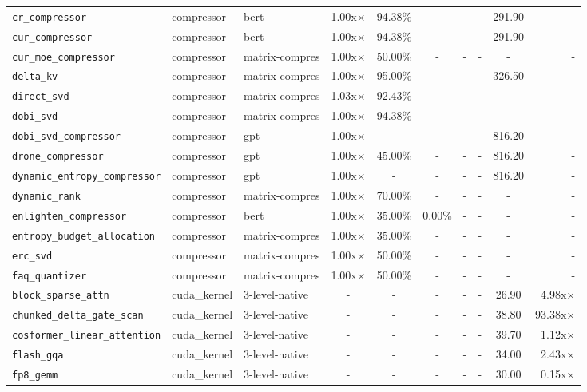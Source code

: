 \begin{center}
\begin{longtable}{lllccccccr}
\texttt{cr\_compressor} & compressor & bert & 1.00x$\times$ & 94.38\% & - & - & - & 291.90 & - \\
\texttt{cur\_compressor} & compressor & bert & 1.00x$\times$ & 94.38\% & - & - & - & 291.90 & - \\
\texttt{cur\_moe\_compressor} & compressor & matrix-compres & 1.00x$\times$ & 50.00\% & - & - & - & - & - \\
\texttt{delta\_kv} & compressor & matrix-compres & 1.00x$\times$ & 95.00\% & - & - & - & 326.50 & - \\
\texttt{direct\_svd} & compressor & matrix-compres & 1.03x$\times$ & 92.43\% & - & - & - & - & - \\
\texttt{dobi\_svd} & compressor & matrix-compres & 1.00x$\times$ & 94.38\% & - & - & - & - & - \\
\texttt{dobi\_svd\_compressor} & compressor & gpt & 1.00x$\times$ & - & - & - & - & 816.20 & - \\
\texttt{drone\_compressor} & compressor & gpt & 1.00x$\times$ & 45.00\% & - & - & - & 816.20 & - \\
\texttt{dynamic\_entropy\_compressor} & compressor & gpt & 1.00x$\times$ & - & - & - & - & 816.20 & - \\
\texttt{dynamic\_rank} & compressor & matrix-compres & 1.00x$\times$ & 70.00\% & - & - & - & - & - \\
\texttt{enlighten\_compressor} & compressor & bert & 1.00x$\times$ & 35.00\% & 0.00\% & - & - & - & - \\
\texttt{entropy\_budget\_allocation} & compressor & matrix-compres & 1.00x$\times$ & 35.00\% & - & - & - & - & - \\
\texttt{erc\_svd} & compressor & matrix-compres & 1.00x$\times$ & 50.00\% & - & - & - & - & - \\
\texttt{faq\_quantizer} & compressor & matrix-compres & 1.00x$\times$ & 50.00\% & - & - & - & - & - \\
\texttt{block\_sparse\_attn} & cuda\_kernel & 3-level-native & - & - & - & - & - & 26.90 & 4.98x$\times$ \\
\texttt{chunked\_delta\_gate\_scan} & cuda\_kernel & 3-level-native & - & - & - & - & - & 38.80 & 93.38x$\times$ \\
\texttt{cosformer\_linear\_attention} & cuda\_kernel & 3-level-native & - & - & - & - & - & 39.70 & 1.12x$\times$ \\
\texttt{flash\_gqa} & cuda\_kernel & 3-level-native & - & - & - & - & - & 34.00 & 2.43x$\times$ \\
\texttt{fp8\_gemm} & cuda\_kernel & 3-level-native & - & - & - & - & - & 30.00 & 0.15x$\times$ \\

\end{longtable}
\end{center}

